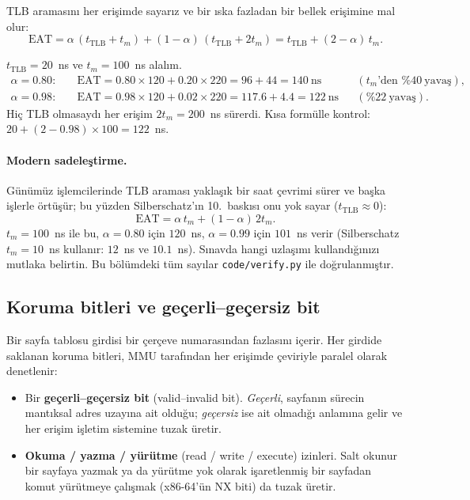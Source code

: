 \documentclass[11pt,a4paper]{article}
\newcommand{\term}[1]{\textbf{\color{mintdeep}#1}}
\begin{document}
\begin{keyidea}
TLB aramasını her erişimde sayarız ve bir ıska fazladan bir bellek erişimine mal olur:
\[
\text{EAT} = \alpha\,(t_{\text{TLB}} + t_{m}) + (1-\alpha)\,(t_{\text{TLB}} + 2t_{m}) = t_{\text{TLB}} + (2-\alpha)\,t_{m}.
\]
\end{keyidea}

\begin{example}
$t_{\text{TLB}} = 20$~ns ve $t_{m} = 100$~ns alalım.
\begin{align*}
\alpha = 0.80:&\quad \text{EAT} = 0.80 \times 120 + 0.20 \times 220 = 96 + 44 = 140\ \text{ns} &&(t_m\text{'den } \%40\ \text{yavaş}),\\
\alpha = 0.98:&\quad \text{EAT} = 0.98 \times 120 + 0.02 \times 220 = 117.6 + 4.4 = 122\ \text{ns} &&(\%22\ \text{yavaş}).
\end{align*}
Hiç TLB olmasaydı her erişim $2t_{m} = 200$~ns sürerdi. Kısa formülle kontrol: $20 + (2-0.98)\times100 = 122$~ns.
\end{example}

\paragraph{Modern sadeleştirme.} Günümüz işlemcilerinde TLB araması yaklaşık bir saat çevrimi sürer ve başka işlerle örtüşür; bu yüzden Silberschatz'ın 10.~baskısı onu yok sayar ($t_{\text{TLB}}\approx 0$):
\[
\text{EAT} = \alpha\,t_{m} + (1-\alpha)\,2t_{m}.
\]
$t_{m} = 100$~ns ile bu, $\alpha = 0.80$ için $120$~ns, $\alpha = 0.99$ için $101$~ns verir (Silberschatz $t_{m}=10$~ns kullanır: $12$~ns ve $10.1$~ns). Sınavda hangi uzlaşımı kullandığınızı mutlaka belirtin. Bu bölümdeki tüm sayılar \texttt{code/verify.py} ile doğrulanmıştır.

\subsection{Koruma bitleri ve geçerli--geçersiz bit}
\label{sec:protbits}

Bir sayfa tablosu girdisi bir çerçeve numarasından fazlasını içerir. Her girdide saklanan koruma bitleri, MMU tarafından her erişimde çeviriyle paralel olarak denetlenir:
\begin{itemize}
  \item Bir \term{geçerli--geçersiz bit} (valid--invalid bit). \emph{Geçerli}, sayfanın sürecin mantıksal adres uzayına ait olduğu; \emph{geçersiz} ise ait olmadığı anlamına gelir ve her erişim işletim sistemine tuzak üretir.
  \item \textbf{Okuma / yazma / yürütme} (read / write / execute) izinleri. Salt okunur bir sayfaya yazmak ya da yürütme yok olarak işaretlenmiş bir sayfadan komut yürütmeye çalışmak (x86-64'ün NX biti) da tuzak üretir.
\end{itemize}
\end{document}
